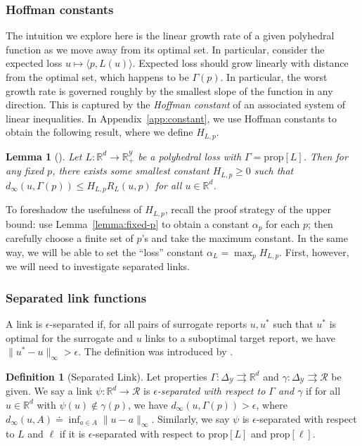 \documentclass{article}
\newtheorem{lemma}{Lemma}
\theoremstyle{definition}\newtheorem{definition}{Definition}
\theoremstyle{definition}\newtheorem{assumption}{Assumption}
\newcommand{\reals}{\mathbb{R}}
\newcommand{\defeq}{\doteq}%
\newcommand{\prop}[1]{\mathrm{prop}[#1]}
\newcommand{\simplex}{\Delta_\Y}
\newcommand{\R}{\mathcal{R}}
\newcommand{\Y}{\mathcal{Y}}
\newcommand{\inprod}[2]{\langle #1, #2 \rangle}%
\newcommand{\toto}{\rightrightarrows}
\begin{document}
\subsubsection{Hoffman constants}
The intuition we explore here is the linear growth rate of a given polyhedral function as we move away from its optimal set.
In particular, consider the expected loss $u \mapsto \inprod{p}{L(u)}$.
Expected loss should grow linearly with distance from the optimal set, which happens to be $\Gamma(p)$.
In particular, the worst growth rate is governed roughly by the smallest slope of the function in any direction.
This is captured by the \emph{Hoffman constant} of an associated system of linear inequalities.
In Appendix~\ref{app:constant}, we use Hoffman constants to obtain the following result, where we define $H_{L,p}$.
\begin{lemma}[\cite{hoffman1952approximate}]
  \label{lemma:hoffman-polyhedral}
  Let $L: \reals^d \to \reals_+^{\Y}$ be a polyhedral loss with $\Gamma = \prop{L}$.
  Then for any fixed $p$, there exists some smallest constant $H_{L,p} \geq 0$ such that $d_{\infty}(u,\Gamma(p)) \leq H_{L,p} R_L(u,p)$ for all $u \in \reals^d$.
\end{lemma}

To foreshadow the usefulness of $H_{L,p}$, recall the proof strategy of the upper bound: use Lemma~\ref{lemma:fixed-p} to obtain a constant $\alpha_p$ for each $p$; then carefully choose a finite set of $p$'s and take the maximum constant.
In the same way, we will be able to set the ``loss'' constant $\alpha_L = \max_p H_{L,p}$.
First, however, we will need to investigate separated links.

\subsubsection{Separated link functions}
A link is $\epsilon$-separated if, for all pairs of surrogate reports $u,u^*$ such that $u^*$ is optimal for the surrogate and $u$ links to a suboptimal target report, we have $\|u^* - u\|_{\infty} > \epsilon$.
The definition was introduced by \citet{finocchiaro2019embedding}.

\begin{definition}[Separated Link]\label{def:sep-link}
  Let properties $\Gamma:\simplex\toto\reals^d$ and $\gamma:\simplex\toto\R$ be given.
  We say a link $\psi:\reals^d\to\R$
  is \emph{$\epsilon$-separated with respect to $\Gamma$ and $\gamma$} if for all $u\in\reals^d$ with $\psi(u)\notin\gamma(p)$, we have $d_\infty(u,\Gamma(p)) > \epsilon$, where $d_\infty(u,A) \defeq \inf_{a\in A} \|u-a\|_\infty$.
  Similarly, we say $\psi$ is $\epsilon$-separated with respect to $L$ and $\ell$ if it is $\epsilon$-separated with respect to $\prop{L}$ and $\prop{\ell}$.
\end{definition}
\end{document}
